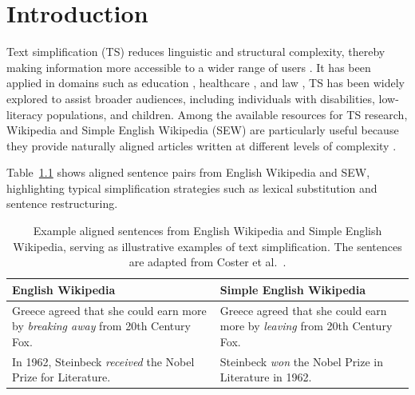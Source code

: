 \documentclass{DESSThesis}
\begin{document}
\tableofcontents
\clearpage
\listoffigures
\clearpage
\listoftables
\clearpage

\chapter{Introduction}
Text simplification (TS) reduces linguistic and structural complexity, thereby making information more accessible to a wider range of users \cite{vstajner2021automatic, 10.1145/3442695, sheang2021controllable}. It has been applied in domains such as education \cite{rebello2019effects, javourey2022simplification}, healthcare \cite{kandula2010semantic}, and law \cite{cemri2022unsupervisedsimplificationlegaltexts, garimella-etal-2022-text}, TS has been widely explored to assist broader audiences, including individuals with disabilities\cite{carroll1998practical, inui2003text}, low-literacy populations\cite{10.1145/1621995.1622002, de2010text}, and children\cite{de2010text}. Among the available resources for TS research, Wikipedia and Simple English Wikipedia (SEW) are particularly useful because they provide naturally aligned articles written at different levels of complexity \cite{coster2011simple, xu-etal-2015-problems, laban2023swipedatasetdocumentlevelsimplification}.

Table~\ref{tab:example_sentences} shows aligned sentence pairs from English Wikipedia and SEW, highlighting typical simplification strategies such as lexical substitution and sentence restructuring.

\begin{table}[h]
\centering
\caption{Example aligned sentences from English Wikipedia and Simple English Wikipedia, 
serving as illustrative examples of text simplification. 
The sentences are adapted from Coster et al.\ \cite{coster2011simple}.}
\label{tab:example_sentences}
\begin{tabular}{p{} p{}}
\toprule
\textbf{English Wikipedia} & \textbf{Simple English Wikipedia} \\
\midrule
Greece agreed that she could earn more by \textit{breaking away} from 20th Century Fox. 
& Greece agreed that she could earn more by \textit{leaving} from 20th Century Fox.\\
\addlinespace
In 1962, Steinbeck \textit{received} the Nobel Prize for Literature. 
& Steinbeck \textit{won} the Nobel Prize in Literature in 1962. \\
\bottomrule
\end{tabular}
\end{table}
\end{document}
